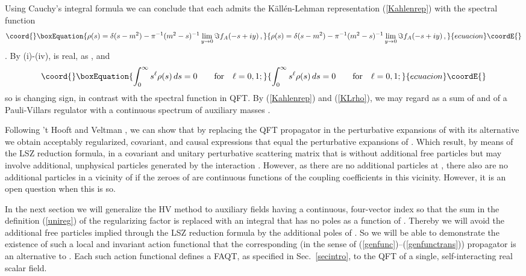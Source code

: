 \documentclass[a4paper,12pt]{article}
\providecommand{\Lagi}{V}
\providecommand{\prop}{\widetilde{\Delta}}
\providecommand{\propF}{\prop_F}
\providecommand{\propA}{\prop_A}
\providecommand{\propR}{\prop_{HV}}
\providecommand{\unreg}{f_{HV}}
\providecommand{\altreg}{f_{A}}
\providecommand{\Gf}{G^{(n)}}
\providecommand{\GfZ}{\Gf_Z}
\providecommand{\GfA}{\Gf_A}
\providecommand{\SmA}{S_A}
\begin{document}
Using Cauchy's integral formula we can conclude that each \myHighlight{$\propA(k)$}\coordHE{} admits the K\"all\'en-Lehman representation (\ref{Kahlenrep}) with the spectral function
\begin{equation}\coord{}\boxEquation{
   \rho(s) = \delta(s-m^2) - \pi^{-1} (m^2 -s)^{-1} \lim_{y \to 0} \Im \altreg(-s + iy) \,,
   \label{KLrho}
}{
   \rho(s) = \delta(s-m^2) - \pi^{-1} (m^2 -s)^{-1} \lim_{y \to 0} \Im \altreg(-s + iy) \,,
   }{ecuacion}\coordE{}\end{equation}
\coordHE{}. By (i)-(iv), \coordHE{} is real, \coordHE{} as \coordHE{}, and
\begin{equation}\coord{}\boxEquation{
   \int_0^\infty s^\ell \rho(s)\, ds = 0 \qquad\hbox{for}\quad \ell = 0, 1;
   \label{KLcon}
}{
   \int_0^\infty s^\ell \rho(s)\, ds = 0 \qquad\hbox{for}\quad \ell = 0, 1;
   }{ecuacion}\coordE{}\end{equation}
so \coordHE{} is changing sign, in contrast with the spectral function in QFT. By (\ref{Kahlenrep}) and (\ref{KLrho}), we may regard \myHighlight{$\propA$}\coordHE{} as a sum of \myHighlight{$\propF$}\coordHE{} and of a Pauli-Villars regulator with a continuous spectrum of auxiliary masses \cite{Pauli}.

Following 't Hooft and Veltman \cite{Hooft}, we can show that by replacing the QFT propagator \myHighlight{$\propF$}\coordHE{} in the perturbative expansions of \myHighlight{$\GfZ$}\coordHE{} with its alternative \myHighlight{$\propA$}\coordHE{} we obtain acceptably regularized, covariant, and causal expressions that equal the perturbative expansions of \myHighlight{$\GfA$}\coordHE{}. Which result, by means of the LSZ reduction formula, in a covariant and unitary perturbative scattering matrix \myHighlight{$\SmA$}\coordHE{} that is without additional free particles but may involve additional, unphysical particles generated by the interaction \cite{Hooft}. However, as there are no additional particles at \myHighlight{$\Lagi = 0$}\coordHE{}, there also are no additional particles in a vicinity of \myHighlight{$\Lagi = 0$}\coordHE{} if the zeroes of \coordHE{} are continuous functions of the coupling coefficients in this vicinity. However, it is an open question when this is so.

In the next section we will generalize the HV method to auxiliary fields having a continuous, four-vector index so that the sum in the definition (\ref{unireg}) of the regularizing factor \myHighlight{$\unreg(k^2)$}\coordHE{} is replaced with an integral that has no poles as a function of \coordHE{}. Thereby we will avoid the additional free particles implied through the LSZ reduction formula by the additional poles of \myHighlight{$\propR(k)$}\coordHE{}. So we will be able to demonstrate the existence of such a local and invariant action functional that the corresponding (in the sense of (\ref{genfunc})--(\ref{genfunctrans})) propagator is an alternative to \myHighlight{$\propF$}\coordHE{}. Each such action functional defines a FAQT, as specified in Sec.~\ref{secintro}, to the QFT of a single, self-interacting real scalar field.
\end{document}
